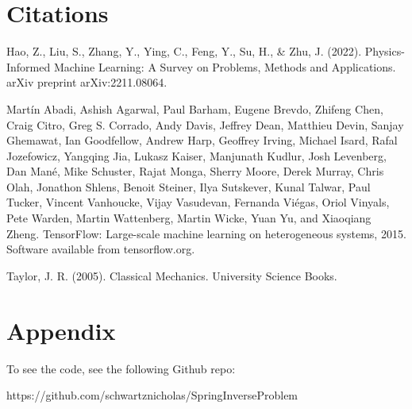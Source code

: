 \documentclass[12pt]{article}
\begin{document}
	\section*{Citations}
Hao, Z., Liu, S., Zhang, Y., Ying, C., Feng, Y., Su, H., \& Zhu, J. (2022). Physics-Informed Machine Learning: A Survey on Problems, Methods and Applications. arXiv preprint arXiv:2211.08064.\newline

Martín Abadi, Ashish Agarwal, Paul Barham, Eugene Brevdo,
Zhifeng Chen, Craig Citro, Greg S. Corrado, Andy Davis,
Jeffrey Dean, Matthieu Devin, Sanjay Ghemawat, Ian Goodfellow,
Andrew Harp, Geoffrey Irving, Michael Isard, Rafal Jozefowicz, Yangqing Jia,
Lukasz Kaiser, Manjunath Kudlur, Josh Levenberg, Dan Mané, Mike Schuster,
Rajat Monga, Sherry Moore, Derek Murray, Chris Olah, Jonathon Shlens,
Benoit Steiner, Ilya Sutskever, Kunal Talwar, Paul Tucker,
Vincent Vanhoucke, Vijay Vasudevan, Fernanda Viégas,
Oriol Vinyals, Pete Warden, Martin Wattenberg, Martin Wicke,
Yuan Yu, and Xiaoqiang Zheng.
TensorFlow: Large-scale machine learning on heterogeneous systems,
2015. Software available from tensorflow.org. \newline

Taylor, J. R. (2005). Classical Mechanics. University Science Books. 
	
	\section*{Appendix}

	To see the code, see the following Github repo:

	https://github.com/schwartznicholas/SpringInverseProblem
	
\end{document}
